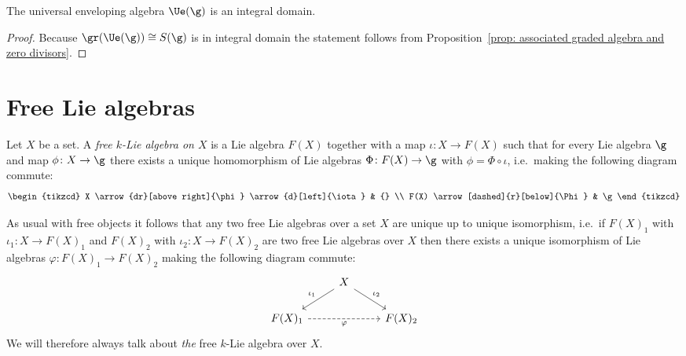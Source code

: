 \begin{corollary}
 The universal enveloping algebra $\Ue(\g)$ is an integral domain.
\end{corollary}
\begin{proof}
 Because $\gr(\Ue(\g)) \cong S(\g)$ is in integral domain the statement follows from Proposition~\ref{prop: associated graded algebra and zero divisors}.
\end{proof}





\section{Free Lie algebras}


\begin{definition}
 Let $X$ be a set. A \emph{free $k$-Lie algebra on $X$} is a Lie algebra $F(X)$ together with a map $\iota \colon X \to F(X)$ such that for every Lie algebra $\g$ and map $\phi \colon X \to \g$ there exists a unique homomorphism of Lie algebras $\Phi \colon F(X) \to \g$ with $\phi = \Phi \circ \iota$, i.e.\ making the following diagram commute:
 \[
   \begin{tikzcd}
     X
     \arrow{dr}[above right]{\phi}
     \arrow{d}[left]{\iota}
     &
     {}
     \\
     F(X)
     \arrow[dashed]{r}[below]{\Phi}
     &
     \g
   \end{tikzcd}
 \]
\end{definition}


\begin{remark}
 As usual with free objects it follows that any two free Lie algebras over a set $X$ are unique up to unique isomorphism, i.e.\ if $F(X)_1$ with $\iota_1 \colon X \to F(X)_1$ and $F(X)_2$ with $\iota_2 \colon X \to F(X)_2$ are two free Lie algebras over $X$ then there exists a unique isomorphism of Lie algebras $\varphi \colon F(X)_1 \to F(X)_2$ making the following diagram commute:
 \[
   \begin{tikzcd}
     {}
     &
     X
     \arrow{dl}[above left]{\iota_1}
     \arrow{dr}[above right]{\iota_2}
     &
     {}
     \\
     F(X)_1
     \arrow[dashed]{rr}[below]{\varphi}
     &
     {}
     &
     F(X)_2
   \end{tikzcd}
 \]
 We will therefore always talk about \emph{the} free $k$-Lie algebra over $X$.
\end{remark}


